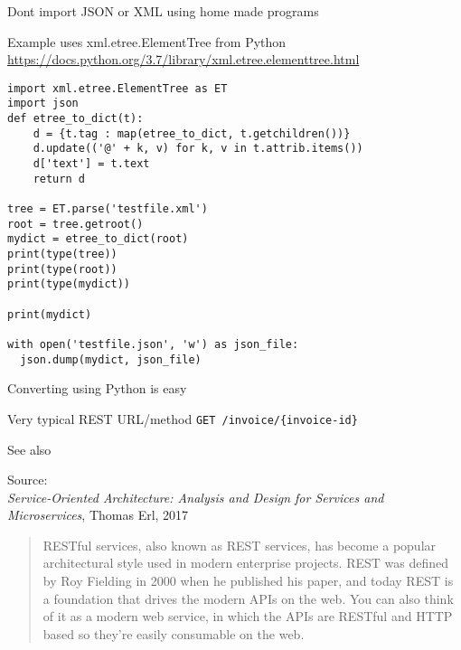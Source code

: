 \documentclass[Screen16to9,17pt]{foils}
\begin{document}
\begin{list2}
\item Dont import JSON or XML using home made programs
\item Example uses xml.etree.ElementTree from Python\\
\url{https://docs.python.org/3.7/library/xml.etree.elementtree.html}
\end{list2}


\begin{verbatim}
import xml.etree.ElementTree as ET
import json
def etree_to_dict(t):
    d = {t.tag : map(etree_to_dict, t.getchildren())}
    d.update(('@' + k, v) for k, v in t.attrib.items())
    d['text'] = t.text
    return d

tree = ET.parse('testfile.xml')
root = tree.getroot()
mydict = etree_to_dict(root)
print(type(tree))
print(type(root))
print(type(mydict))

print(mydict)

with open('testfile.json', 'w') as json_file:
  json.dump(mydict, json_file)
\end{verbatim}

Converting using Python is easy








\begin{list2}
\item Very typical REST URL/method \verb+GET /invoice/{invoice-id}+
\item See also 
\end{list2}
Source: {\footnotesize\\
\emph{Service‑Oriented Architecture: Analysis and Design for Services and Microservices}, Thomas Erl, 2017}





\begin{quote}
  RESTful services, also known as REST services, has become a popular architectural style
  used in modern enterprise projects. REST was defined by Roy Fielding in 2000 when
  he published his paper, and today REST is a foundation that drives the modern APIs
  on the web. You can also think of it as a modern web service, in which the APIs are
  RESTful and HTTP based so they’re easily consumable on the web.
\end{quote}
\end{document}
